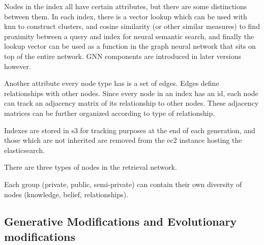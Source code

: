 
Nodes in the index all have certain attributes, but there are some distinctions between them. In each index, there is a vector lookup which can be used with knn to construct clusters, and cosine similarity (or other similar measures) to find proximity between a query and index for neural semantic search, and finally the lookup vector can be used as a function in the graph neural network that sits on top of the entire network. GNN components are introduced in later versions however.

Another attribute every node type has is a set of edges. Edges define relationships with other nodes. Since every node in an index has an id, each node can track an adjacency matrix of its relationship to other nodes. These adjacency matrices can be further organized according to type of relationship.

Indexes are stored in s3 for tracking purposes at the end of each generation, and those which are not inherited are removed from the ec2 instance hosting the elasticsearch.


There are three types of nodes in the retrieval network.


Each group (private, public, semi-private) can contain their own diversity of nodes (knowledge, belief, relationships).

\subsection{Generative Modifications and Evolutionary modifications}

